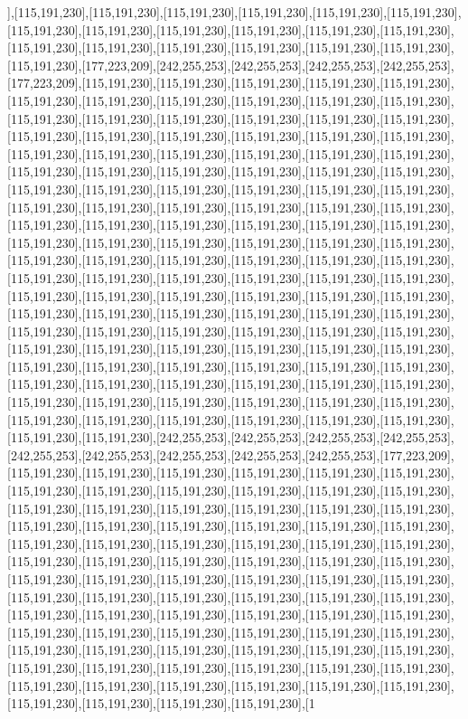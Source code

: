 ],[115,191,230],[115,191,230],[115,191,230],[115,191,230],[115,191,230],[115,191,230],[115,191,230],[115,191,230],[115,191,230],[115,191,230],[115,191,230],[115,191,230],[115,191,230],[115,191,230],[115,191,230],[115,191,230],[115,191,230],[115,191,230],[115,191,230],[177,223,209],[242,255,253],[242,255,253],[242,255,253],[242,255,253],[177,223,209],[115,191,230],[115,191,230],[115,191,230],[115,191,230],[115,191,230],[115,191,230],[115,191,230],[115,191,230],[115,191,230],[115,191,230],[115,191,230],[115,191,230],[115,191,230],[115,191,230],[115,191,230],[115,191,230],[115,191,230],[115,191,230],[115,191,230],[115,191,230],[115,191,230],[115,191,230],[115,191,230],[115,191,230],[115,191,230],[115,191,230],[115,191,230],[115,191,230],[115,191,230],[115,191,230],[115,191,230],[115,191,230],[115,191,230],[115,191,230],[115,191,230],[115,191,230],[115,191,230],[115,191,230],[115,191,230],[115,191,230],[115,191,230],[115,191,230],[115,191,230],[115,191,230],[115,191,230],[115,191,230],[115,191,230],[115,191,230],[115,191,230],[115,191,230],[115,191,230],[115,191,230],[115,191,230],[115,191,230],[115,191,230],[115,191,230],[115,191,230],[115,191,230],[115,191,230],[115,191,230],[115,191,230],[115,191,230],[115,191,230],[115,191,230],[115,191,230],[115,191,230],[115,191,230],[115,191,230],[115,191,230],[115,191,230],[115,191,230],[115,191,230],[115,191,230],[115,191,230],[115,191,230],[115,191,230],[115,191,230],[115,191,230],[115,191,230],[115,191,230],[115,191,230],[115,191,230],[115,191,230],[115,191,230],[115,191,230],[115,191,230],[115,191,230],[115,191,230],[115,191,230],[115,191,230],[115,191,230],[115,191,230],[115,191,230],[115,191,230],[115,191,230],[115,191,230],[115,191,230],[115,191,230],[115,191,230],[115,191,230],[115,191,230],[115,191,230],[115,191,230],[115,191,230],[115,191,230],[115,191,230],[115,191,230],[115,191,230],[115,191,230],[115,191,230],[115,191,230],[115,191,230],[115,191,230],[115,191,230],[115,191,230],[115,191,230],[115,191,230],[115,191,230],[115,191,230],[115,191,230],[115,191,230],[242,255,253],[242,255,253],[242,255,253],[242,255,253],[242,255,253],[242,255,253],[242,255,253],[242,255,253],[242,255,253],[177,223,209],[115,191,230],[115,191,230],[115,191,230],[115,191,230],[115,191,230],[115,191,230],[115,191,230],[115,191,230],[115,191,230],[115,191,230],[115,191,230],[115,191,230],[115,191,230],[115,191,230],[115,191,230],[115,191,230],[115,191,230],[115,191,230],[115,191,230],[115,191,230],[115,191,230],[115,191,230],[115,191,230],[115,191,230],[115,191,230],[115,191,230],[115,191,230],[115,191,230],[115,191,230],[115,191,230],[115,191,230],[115,191,230],[115,191,230],[115,191,230],[115,191,230],[115,191,230],[115,191,230],[115,191,230],[115,191,230],[115,191,230],[115,191,230],[115,191,230],[115,191,230],[115,191,230],[115,191,230],[115,191,230],[115,191,230],[115,191,230],[115,191,230],[115,191,230],[115,191,230],[115,191,230],[115,191,230],[115,191,230],[115,191,230],[115,191,230],[115,191,230],[115,191,230],[115,191,230],[115,191,230],[115,191,230],[115,191,230],[115,191,230],[115,191,230],[115,191,230],[115,191,230],[115,191,230],[115,191,230],[115,191,230],[115,191,230],[115,191,230],[115,191,230],[115,191,230],[115,191,230],[115,191,230],[115,191,230],[115,191,230],[115,191,230],[115,191,230],[115,191,230],[115,191,230],[115,191,230],[1